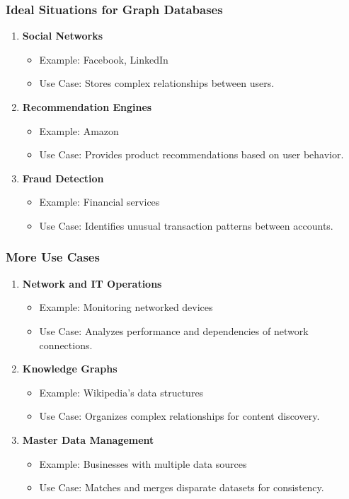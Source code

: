 \documentclass[aspectratio=169]{beamer}
\begin{document}
\begin{frame}[fragile]
    \frametitle{Ideal Situations for Graph Databases}
    \begin{enumerate}
        \item \textbf{Social Networks}
        \begin{itemize}
            \item Example: Facebook, LinkedIn
            \item Use Case: Stores complex relationships between users.
        \end{itemize}

        \item \textbf{Recommendation Engines}
        \begin{itemize}
            \item Example: Amazon
            \item Use Case: Provides product recommendations based on user behavior.
        \end{itemize}

        \item \textbf{Fraud Detection}
        \begin{itemize}
            \item Example: Financial services
            \item Use Case: Identifies unusual transaction patterns between accounts.
        \end{itemize}
    \end{enumerate}
\end{frame}

\begin{frame}[fragile]
    \frametitle{More Use Cases}
    \begin{enumerate}[\setcounter{enumi}{3}]
        \item \textbf{Network and IT Operations}
        \begin{itemize}
            \item Example: Monitoring networked devices
            \item Use Case: Analyzes performance and dependencies of network connections.
        \end{itemize}

        \item \textbf{Knowledge Graphs}
        \begin{itemize}
            \item Example: Wikipedia's data structures
            \item Use Case: Organizes complex relationships for content discovery.
        \end{itemize}

        \item \textbf{Master Data Management}
        \begin{itemize}
            \item Example: Businesses with multiple data sources
            \item Use Case: Matches and merges disparate datasets for consistency.
        \end{itemize}
    \end{enumerate}
\end{frame}
\end{document}
